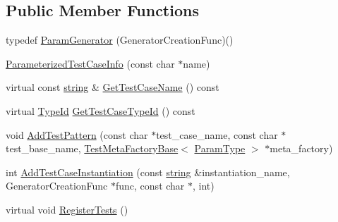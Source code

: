 \subsection*{\-Public \-Member \-Functions}
\begin{DoxyCompactItemize}
\item 
typedef \hyperlink{classtesting_1_1internal_1_1ParameterizedTestCaseInfo_a09d1f141a9bb4bec4a33ed828cf6994e}{\-Param\-Generator} (\-Generator\-Creation\-Func)()
\item 
\hyperlink{classtesting_1_1internal_1_1ParameterizedTestCaseInfo_a491a8dc63e21c9d48050dfd73e57b15d}{\-Parameterized\-Test\-Case\-Info} (const char $\ast$name)
\item 
virtual const \hyperlink{namespacetesting_1_1internal_a9882e571372fc19a02d2b2949e1f1557}{string} \& \hyperlink{classtesting_1_1internal_1_1ParameterizedTestCaseInfo_a9e679ad2a45b98252c3765bdc845088d}{\-Get\-Test\-Case\-Name} () const 
\item 
virtual \hyperlink{namespacetesting_1_1internal_ac8e91f0c6a06c0361dc3152ddfeb2342}{\-Type\-Id} \hyperlink{classtesting_1_1internal_1_1ParameterizedTestCaseInfo_ab5ef14ff297f26cac2cae0c7362bd48e}{\-Get\-Test\-Case\-Type\-Id} () const 
\item 
void \hyperlink{classtesting_1_1internal_1_1ParameterizedTestCaseInfo_a562f916d8fbba6cd5f9746b7b5cbb832}{\-Add\-Test\-Pattern} (const char $\ast$test\-\_\-case\-\_\-name, const char $\ast$test\-\_\-base\-\_\-name, \hyperlink{classtesting_1_1internal_1_1TestMetaFactoryBase}{\-Test\-Meta\-Factory\-Base}$<$ \hyperlink{classtesting_1_1internal_1_1ParameterizedTestCaseInfo_ab50f5599aaeeb72dd821ed2d71ad8e35}{\-Param\-Type} $>$ $\ast$meta\-\_\-factory)
\item 
int \hyperlink{classtesting_1_1internal_1_1ParameterizedTestCaseInfo_a49e5b26e6b171ebe8b16fdebfb3b13df}{\-Add\-Test\-Case\-Instantiation} (const \hyperlink{namespacetesting_1_1internal_a9882e571372fc19a02d2b2949e1f1557}{string} \&instantiation\-\_\-name, \-Generator\-Creation\-Func $\ast$func, const char $\ast$, int)
\item 
virtual void \hyperlink{classtesting_1_1internal_1_1ParameterizedTestCaseInfo_a8e4e465bc105726f8b9218540b555525}{\-Register\-Tests} ()
\end{DoxyCompactItemize}
